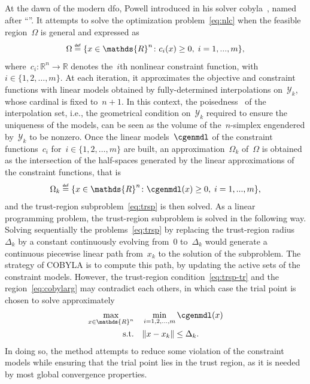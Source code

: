 \documentclass[11pt,draft]{article}
\numberwithin{equation}{section}
\def\defeq{\ensuremath{\mathrel{\stackrel{\text{\tiny\textsf{def}}}{=}}}}
\def\R{\ensuremath{\mathds{R}}}
\newcommand\norm[2][]{#1\|#2#1\|}
\newcommand\set[2][]{#1\{#2#1\}}
\def\srchsp{\ensuremath{\Omega}}
\newcommand\cgen[1][i]{c_{#1}}
\newcommand\srchspmdl[1][k]{\Omega_{#1}}
\newcommand\iter[1][k]{x_{#1}}
\newcommand\trg[1][k]{\Delta_{#1}}
\newcommand\itpls[1][k]{\mathcal{Y}_{#1}}
\begin{document}
\subsection{}

At the dawn of the modern \gls{dfo}, Powell introduced in  his solver \gls{cobyla}~\cite{Powell_1994}, named after \enquote{}.
It attempts to solve the optimization problem~\eqref{eq:nlc} when the feasible region~$\srchsp$ is general and expressed as
\[
    \srchsp \defeq \set{x \in \R^n \colon \cgen(x) \ge 0,\; i=1,...,m},
\]
where~$\cgen \colon \R^n \to \R$ denotes the~$i$th nonlinear constraint function, with~$i \in \set{1, 2, \dots, m}$.
At each iteration, it approximates the objective and constraint functions with linear models obtained by fully-determined interpolations on~$\itpls$, whose cardinal is fixed to~$n + 1$.
In this context, the poisedness~\cite[\S 1]{Sauer_Xu_1995} of the interpolation set, i.e., the geometrical condition on~$\itpls$ required to ensure the uniqueness of the models, can be seen as the volume of the~$n$-simplex engendered by~$\itpls$ to be nonzero.
Once the linear models~$\cgenmdl$ of the constraint functions~$\cgen$ for~$i \in \set{1, 2, \dots, m}$ are built, an approximation~$\srchspmdl$ of~$\srchsp$ is obtained as the intersection of the half-spaces generated by the linear approximations of the constraint functions, that is
\begin{equation}
    \label{eq:cobylarg}
    \srchspmdl \defeq \set{x \in \R^n \colon \cgenmdl(x) \ge 0,\; i=1,...,m},
\end{equation}
and the trust-region subproblem~\eqref{eq:trsp} is then solved.
As a linear programming problem, the trust-region subproblem is solved in the following way.
Solving sequentially the problems~\eqref{eq:trsp} by replacing the trust-region radius~$\trg$ by a constant continuously evolving from~$0$ to~$\trg$ would generate a continuous piecewise linear path from~$\iter$ to the solution of the subproblem.
The strategy of COBYLA is to compute this path, by updating the active sets of the constraint models.
However, the trust-region condition~\eqref{eq:trsp-tr} and the region~\eqref{eq:cobylarg} may contradict each others, in which case the trial point is chosen to solve approximately
\begin{align*}
    \max_{x \in \R^n}   & \quad \min_{i = 1, 2, \dots, m} \cgenmdl(x)\\
    \text{s.t.}         & \quad \norm{x - \iter} \le \trg.
\end{align*}
In doing so, the method attempts to reduce some violation of the constraint models while ensuring that the trial point lies in the trust region, as it is needed by most global convergence properties.
\end{document}
